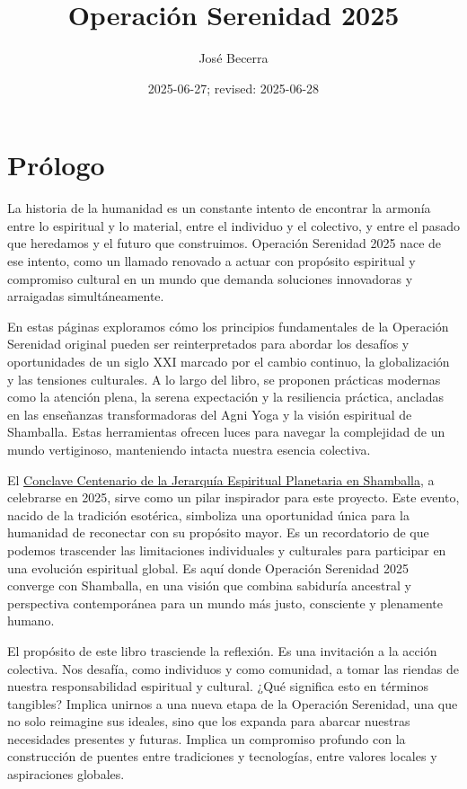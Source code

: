 \documentclass[
]{book}
\title{Operación Serenidad 2025}
\author{José Becerra}
\date{2025-06-27; revised: 2025-06-28}
\begin{document}
\maketitle

{
\setcounter{tocdepth}{1}
\tableofcontents
}
\chapter*{Prólogo}\label{pruxf3logo}

La historia de la humanidad es un constante intento de encontrar la armonía entre lo espiritual y lo material, entre el individuo y el colectivo, y entre el pasado que heredamos y el futuro que construimos. Operación Serenidad 2025 nace de ese intento, como un llamado renovado a actuar con propósito espiritual y compromiso cultural en un mundo que demanda soluciones innovadoras y arraigadas simultáneamente.

En estas páginas exploramos cómo los principios fundamentales de la Operación Serenidad original pueden ser reinterpretados para abordar los desafíos y oportunidades de un siglo XXI marcado por el cambio continuo, la globalización y las tensiones culturales. A lo largo del libro, se proponen prácticas modernas como la atención plena, la serena expectación y la resiliencia práctica, ancladas en las enseñanzas transformadoras del Agni Yoga y la visión espiritual de Shamballa. Estas herramientas ofrecen luces para navegar la complejidad de un mundo vertiginoso, manteniendo intacta nuestra esencia colectiva.

El \href{https://transhimalayica.mx/producto/the-centennial-conclave/}{Conclave Centenario de la Jerarquía Espiritual Planetaria en Shamballa}, a celebrarse en 2025, sirve como un pilar inspirador para este proyecto. Este evento, nacido de la tradición esotérica, simboliza una oportunidad única para la humanidad de reconectar con su propósito mayor. Es un recordatorio de que podemos trascender las limitaciones individuales y culturales para participar en una evolución espiritual global. Es aquí donde Operación Serenidad 2025 converge con Shamballa, en una visión que combina sabiduría ancestral y perspectiva contemporánea para un mundo más justo, consciente y plenamente humano.

El propósito de este libro trasciende la reflexión. Es una invitación a la acción colectiva. Nos desafía, como individuos y como comunidad, a tomar las riendas de nuestra responsabilidad espiritual y cultural. ¿Qué significa esto en términos tangibles? Implica unirnos a una nueva etapa de la Operación Serenidad, una que no solo reimagine sus ideales, sino que los expanda para abarcar nuestras necesidades presentes y futuras. Implica un compromiso profundo con la construcción de puentes entre tradiciones y tecnologías, entre valores locales y aspiraciones globales.
\end{document}
